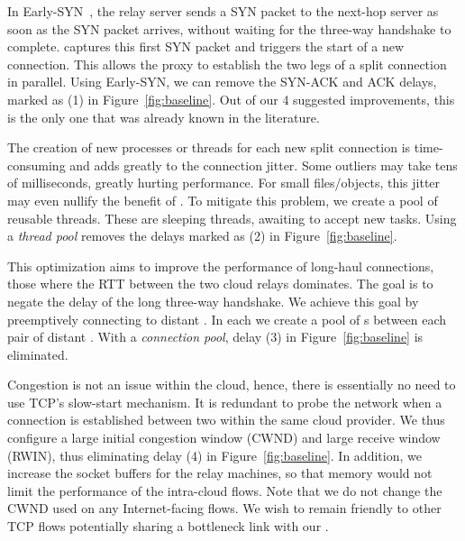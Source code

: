 
  In Early-SYN~\cite{ladiwala,siracusano2016miniproxy}, the relay server sends a SYN packet to the next-hop server as soon as the SYN packet arrives, without waiting for the three-way handshake to complete. \oursys captures this first SYN packet and triggers the start of a new connection. This allows the proxy to establish the two legs of a split connection in parallel. Using {Early-SYN}, we can remove the SYN-ACK and ACK delays, marked as (1) in Figure~\ref{fig:baseline}. Out of our 4 suggested improvements, this is the only one that was already known in the literature.

The creation of new processes or threads for each new split connection is time-consuming and adds greatly to the connection jitter. Some outliers may take tens of milliseconds, greatly hurting performance. For small files/objects, this jitter may even nullify the benefit of \oursys. To mitigate this problem, we create a pool of reusable threads. These are sleeping threads, awaiting to accept new tasks. Using a \textit{thread pool} removes the delays marked as (2) in Figure~\ref{fig:baseline}. 

 This optimization aims to improve the performance of long-haul connections, \ie those where the RTT between the two cloud relays dominates. The goal is to negate the delay of the long three-way handshake. We achieve this goal by preemptively connecting to distant \relays. In each \relay we create a pool of {\reconn}s between each pair of distant \relays.
With a \textit{connection pool}, delay (3) in Figure~\ref{fig:baseline} is eliminated.

Congestion is not an issue within the cloud, hence, there is essentially no need to use TCP's slow-start mechanism. It is redundant to probe the network when a connection is established between two \relays within the same cloud provider. We thus configure a large initial congestion window (CWND) and large receive window (RWIN), thus eliminating delay (4) in Figure~\ref{fig:baseline}. In addition, we increase the socket buffers for the relay machines, so that memory would not limit the performance of the intra-cloud flows.
Note that we do not change the CWND used on any Internet-facing flows. We wish to remain friendly to other TCP flows potentially sharing a bottleneck link with our \relays.
